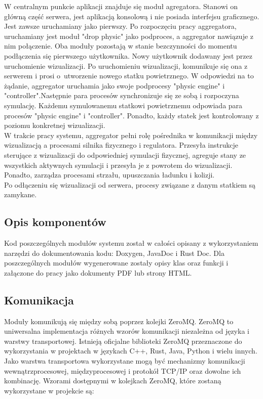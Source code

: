 \documentclass[15pt]{sprawozdanie}
\begin{document}
W centralnym punkcie aplikacji znajduje się moduł agregatora. Stanowi on główną część serwera, jest aplikacją konsolową i nie posiada interfejsu graficznego. Jest zawsze uruchamiany jako pierwszy. Po rozpoczęciu pracy aggregatora, uruchamiany jest moduł "drop physic" jako podproces, a aggregator nawiązuje z nim połączenie. Oba moduły pozostają w stanie bezczynności do momentu podłączenia się pierwszego użytkownika. Nowy użytkownik dodawany jest przez uruchomienie wizualizacji. Po uruchomieniu wizualizacji, komunikuje się ona z serwerem i prosi o~utworzenie nowego statku powietrznego. W odpowiedzi na to żądanie, aggregator uruchamia jako swoje podprocesy "physic engine" i "controller".Następnie para procesów synchronizuje się ze sobą i rozpoczyna symulację. Każdemu symulowanemu statkowi powietrznemu odpowiada para procesów "physic engine" i "controller". Ponadto, każdy statek jest kontrolowany z poziomu konkretnej wizualizacji.\\

W trakcie pracy systemu, aggregator pełni rolę pośrednika w komunikacji między wizualizacją a procesami silnika fizycznego i regulatora. Przesyła instrukcje sterujące z wizualizacji do odpowiedniej symulacji fizycznej, agreguje stany ze wszystkich aktywnych symulacji i przesyła je z powrotem do wizualizacji. Ponadto, zarządza procesami strzału, upuszczania ładunku i kolizji.\\

Po odłączeniu się wizualizacji od serwera, procesy związane z danym statkiem są zamykane.


\subsection{Opis komponentów}

Kod poszczególnych modułów systemu został w całości opisany z wykorzystaniem narzędzi do dokumentowania kodu: Doxygen, JavaDoc i Rust Doc. Dla poszczególnych modułów wygenerowane zostały opisy klas oraz funkcji i załączone do pracy jako dokumenty PDF lub strony HTML.

\newpage

\subsection{Komunikacja}

Moduły komunikują się między sobą poprzez kolejki ZeroMQ\cite{zmqguide}. ZeroMQ to uniwersalna implementacja różnych wzorów komunikacji niezależna od języka i warstwy transportowej. Istnieją oficjalne biblioteki ZeroMQ przeznaczone do wykorzystania w projektach w językach  C++, Rust, Java, Python i wielu innych. Jako warstwa transportowa wykorzystane mogą być mechanizmy komunikacji wewnątrzprocesowej, międzyprocesowej i protokół TCP/IP oraz dowolne ich kombinację. Wzorami dostępnymi w kolejkach ZeroMQ, które zostaną wykorzystane w projekcie są:
\end{document}

